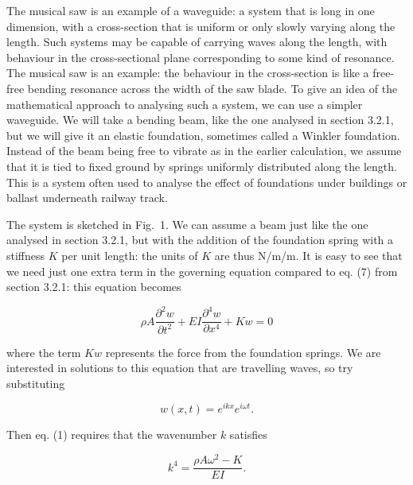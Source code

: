   The musical saw is an example of a waveguide: a system that is long in one 
  dimension, with a cross-section that is uniform or only slowly varying along 
  the length. Such systems may be capable of carrying waves along the length, 
  with behaviour in the cross-sectional plane corresponding to some kind of 
  resonance. The musical saw is an example: the behaviour in the cross-section 
  is like a free-free bending resonance across the width of the saw blade. To 
  give an idea of the mathematical approach to analysing such a system, we can 
  use a simpler waveguide. We will take a bending beam, like the one analysed 
  in section 3.2.1, but we will give it an elastic foundation, sometimes called 
  a Winkler foundation. Instead of the beam being free to vibrate as in the 
  earlier calculation, we assume that it is tied to fixed ground by springs 
  uniformly distributed along the length. This is a system often used to 
  analyse the effect of foundations under buildings or ballast underneath 
  railway track. 


  The system is sketched in Fig.\ 1. We can assume a beam just like the one 
  analysed in section 3.2.1, but with the addition of the foundation spring 
  with a stiffness $K$ per unit length: the units of $K$ are thus N/m/m. It is 
  easy to see that we need just one extra term in the governing equation 
  compared to eq. (7) from section 3.2.1: this equation becomes 

  \begin{equation*}\rho A \dfrac{\partial^2 w}{\partial t^2}+EI 
  \dfrac{\partial^4 w}{\partial x^4} + K w=0\tag{1}\end{equation*} 

  \noindent{}where the term $Kw$ represents the force from the foundation 
  springs. We are interested in solutions to this equation that are travelling 
  waves, so try substituting 

  \begin{equation*}w(x,t) = e^{i k x} e^{i \omega t} .\tag{2}\end{equation*} 

  Then eq. (1) requires that the wavenumber $k$ satisfies 

  \begin{equation*}k^4 = \dfrac{\rho A \omega^2 -K}{EI} . 
  \tag{3}\end{equation*} 


